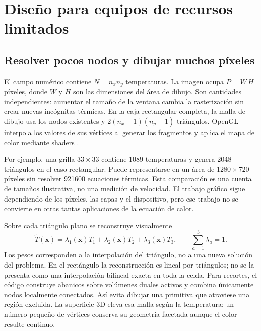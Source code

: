 \documentclass[11pt,a4paper]{article}
\begin{document}
\section{Diseño para equipos de recursos limitados}
\subsection{Resolver pocos nodos y dibujar muchos píxeles}
El campo numérico contiene $N=n_xn_y$ temperaturas. La imagen ocupa $P=W\,H$ píxeles, donde $W$ y $H$ son las dimensiones del área de dibujo. Son cantidades independientes: aumentar el tamaño de la ventana cambia la rasterización sin crear nuevas incógnitas térmicas. En la caja rectangular completa, la malla de dibujo usa los nodos existentes y $2(n_x-1)(n_y-1)$ triángulos. OpenGL interpola los valores de sus vértices al generar los fragmentos y aplica el mapa de color mediante shaders \cite{glsl}.

Por ejemplo, una grilla $33\times33$ contiene 1089 temperaturas y genera 2048 triángulos en el caso rectangular. Puede representarse en un área de $1280\times720$ píxeles sin resolver 921600 ecuaciones térmicas. Esta comparación es una cuenta de tamaños ilustrativa, no una medición de velocidad. El trabajo gráfico sigue dependiendo de los píxeles, las capas y el dispositivo, pero ese trabajo no se convierte en otras tantas aplicaciones de la ecuación de calor.

Sobre cada triángulo plano se reconstruye visualmente
\begin{equation}
 \widetilde T(\mathbf x)=\lambda_1(\mathbf x)T_1+\lambda_2(\mathbf x)T_2+\lambda_3(\mathbf x)T_3,\qquad \sum_{a=1}^{3}\lambda_a=1.
 \label{eq:render}
\end{equation}
Los pesos corresponden a la interpolación del triángulo, no a una nueva solución del problema. En el rectángulo la reconstrucción es lineal por triángulos; no se la presenta como una interpolación bilineal exacta en toda la celda. Para recortes, el código construye abanicos sobre volúmenes duales activos y combina únicamente nodos localmente conectados. Así evita dibujar una primitiva que atraviese una región excluida. La superficie 3D eleva esa malla según la temperatura; un número pequeño de vértices conserva su geometría facetada aunque el color resulte continuo.
\end{document}
